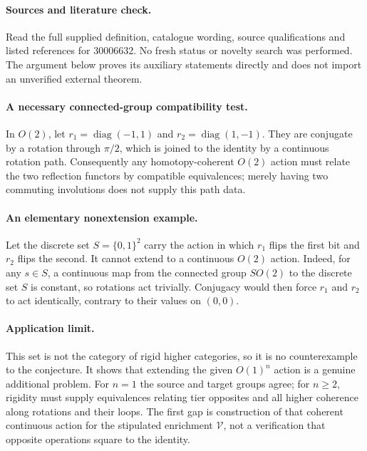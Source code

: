 \documentclass[11pt]{article}
\begin{document}
\paragraph{Sources and literature check.}
Read the full supplied definition, catalogue wording, source qualifications and listed references for 30006632. No fresh status or novelty search was performed. The argument below proves its auxiliary statements directly and does not import an unverified external theorem.

\paragraph{A necessary connected-group compatibility test.} In \(O(2)\), let \(r_1=\operatorname{diag}(-1,1)\) and \(r_2=\operatorname{diag}(1,-1)\). They are conjugate by a rotation through \(\pi/2\), which is joined to the identity by a continuous rotation path. Consequently any homotopy-coherent \(O(2)\) action must relate the two reflection functors by compatible equivalences; merely having two commuting involutions does not supply this path data.
\paragraph{An elementary nonextension example.} Let the discrete set \(S=\{0,1\}^2\) carry the action in which \(r_1\) flips the first bit and \(r_2\) flips the second. It cannot extend to a continuous \(O(2)\) action. Indeed, for any \(s\in S\), a continuous map from the connected group \(SO(2)\) to the discrete set \(S\) is constant, so rotations act trivially. Conjugacy would then force \(r_1\) and \(r_2\) to act identically, contrary to their values on \((0,0)\).
\paragraph{Application limit.} This set is not the category of rigid higher categories, so it is no counterexample to the conjecture. It shows that extending the given \(O(1)^n\) action is a genuine additional problem. For \(n=1\) the source and target groups agree; for \(n\geq2\), rigidity must supply equivalences relating tier opposites and all higher coherence along rotations and their loops. The first gap is construction of that coherent continuous action for the stipulated enrichment \(\mathcal V\), not a verification that opposite operations square to the identity.
\end{document}
